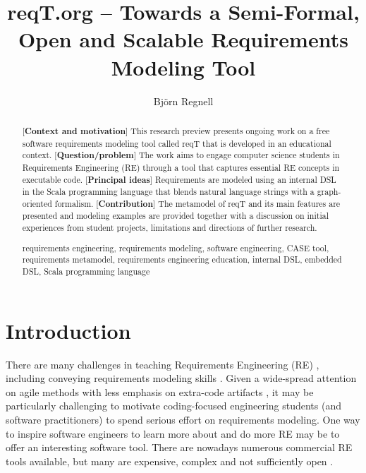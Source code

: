 \documentclass[a4paper]{llncs}
\newcommand{\keywords}[1]{\par\addvspace\baselineskip
\noindent\keywordname\enspace\ignorespaces#1}
\begin{document}

\mainmatter  %

\title{reqT.org --  Towards a Semi-Formal, Open and Scalable Requirements Modeling Tool}


\author{Bj\"orn Regnell}
%


\maketitle

\begin{abstract}
[{\bf Context and motivation}] This research preview presents ongoing work on a free software requirements modeling tool called reqT that is developed in an educational context. [{\bf Question/problem}] The work aims to engage computer science students in Requirements Engineering (RE) through a tool that captures essential RE concepts in executable code. [{\bf Principal ideas}] Requirements are modeled using an internal DSL in the Scala programming language that blends natural language strings with a graph-oriented formalism. [{\bf Contribution}] The metamodel of reqT and its main features are presented and modeling examples are provided together with a discussion on initial experiences from student projects, limitations and directions of further research.   
\keywords{requirements engineering, requirements modeling, software engineering, CASE tool, requirements metamodel, requirements engineering education, internal DSL, embedded DSL, Scala programming language}
\end{abstract}

\section{Introduction}
There are many challenges in teaching Requirements Engineering (RE) \cite{Memon2010, Regev2011}, including  conveying requirements modeling skills \cite{Callele2006}. Given a wide-spread attention on agile methods with less emphasis on extra-code artifacts \cite{Ramesh2010}, it may be particularly challenging to motivate coding-focused engineering students (and software practitioners) to spend serious effort on requirements modeling. One way to inspire software engineers to learn more about and do more RE may be to offer an interesting software tool. There are nowadays numerous commercial RE tools available, but many are expensive, complex and not sufficiently open  \cite{Carillo2011}.  
\end{document}
